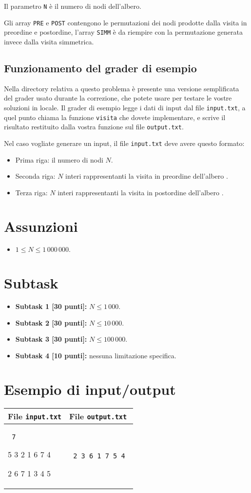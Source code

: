\documentclass[a4paper,11pt]{article}
\newcommand{\file}[1]{\texttt{#1}}
\newcommand{\esempio}[2]{
\noindent\begin{minipage}{\textwidth}
\begin{tabular}{|p{11cm}|p{5cm}|}
	\hline
	\textbf{File \file{input.txt}} & \textbf{File \file{output.txt}}\\
	\hline
	\tt \small #1 &
	\tt \small #2 \\
	\hline
\end{tabular}
\end{minipage}
}
\begin{document}
Il parametro \texttt{N} è il numero di nodi dell'albero.

Gli array \texttt{PRE} e \texttt{POST} contengono le permutazioni dei nodi prodotte dalla visita in preordine e postordine,
l'array \texttt{SIMM} \`e da riempire con la permutazione generata invece dalla visita simmetrica.

\subsection*{Funzionamento del grader di esempio}
Nella directory relativa a questo problema è presente una versione
semplificata del grader usato durante la correzione, che potete usare
per testare le vostre soluzioni in locale. Il grader di esempio legge
i dati di input dal file \file{input.txt}, a quel punto chiama la
funzione \texttt{visita} che dovete implementare, e scrive il risultato
restituito dalla vostra funzione sul file \file{output.txt}.

Nel caso vogliate generare un input, il file \file{input.txt} deve
avere questo formato:
\begin{itemize}[noitemsep]
\item Prima riga: il numero di nodi $N$.
\item Seconda riga: $N$ interi rappresentanti la visita in preordine dell'albero .
\item Terza riga: $N$ interi rappresentanti la visita in postordine dell'albero .
\end{itemize}


\section*{Assunzioni}
\begin{itemize}[nolistsep, noitemsep]
\item $1 \le N \le 1\,000\,000 $.
\end{itemize}

\section*{Subtask}
\begin{itemize}
\item \textbf{Subtask 1 [30 punti]:} $N \le 1\,000$.
\item \textbf{Subtask 2 [30 punti]:} $N \le 10\,000$.
\item \textbf{Subtask 3 [30 punti]:} $N \le 100\,000$.
\item \textbf{Subtask 4 [10 punti]:} nessuna limitazione specifica.
\end{itemize}


\section*{Esempio di input/output}
\esempio{
7

5 3 2 1 6 7 4

2 6 7 1 3 4 5

}{
2 3 6 1 7 5 4
}
\end{document}

